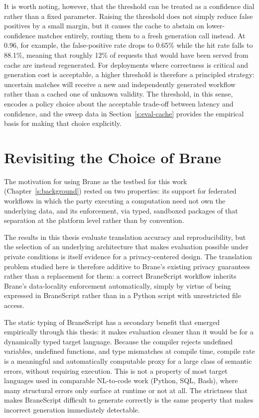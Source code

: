It is worth noting, however, that the threshold can be treated as a
confidence dial rather than a fixed parameter. Raising the threshold does not
simply reduce false positives by a small margin, but it causes the cache to
abstain on lower-confidence matches entirely, routing them to a fresh
generation call instead. At 0.96, for example, the false-positive rate drops
to 0.65\% while the hit rate falls to 88.1\%, meaning that roughly 12\% of
requests that would have been served from cache are instead regenerated. For
deployments where correctness is critical and generation cost is acceptable,
a higher threshold is therefore a principled strategy: uncertain matches will
receive a new and independently generated workflow rather than a cached one of
unknown validity. The threshold, in this sense, encodes a policy choice about
the acceptable trade-off between latency and confidence, and the sweep data
in Section~\ref{s:eval-cache} provides the empirical basis for making that
choice explicitly.


\section{Revisiting the Choice of Brane}

The motivation for using Brane as the testbed for this work
(Chapter~\ref{s:background}) rested on two properties: its support for
federated workflows in which the party executing a computation need not own
the underlying data, and its enforcement, via typed, sandboxed packages
of that separation at the platform level rather than by convention. 

The results in this thesis evaluate translation accuracy and reproducibility, 
but the selection of an underlying architecture that makes evaluation possible under private conditions
is itself evidence for a privacy-centered design. 
The translation problem studied here is therefore additive to Brane's existing privacy guarantees
rather than a replacement for them: a correct BraneScript workflow inherits
Brane's data-locality enforcement automatically, simply by virtue of being
expressed in BraneScript rather than in a Python script with unrestricted file
access.

The static typing of BraneScript has a secondary benefit that emerged
empirically through this thesis: it makes evaluation cleaner than it would be
for a dynamically typed target language. Because the compiler rejects undefined
variables, undefined functions, and type mismatches at compile time, compile
rate is a meaningful and automatically computable proxy for a large class of
semantic errors, without requiring execution. This is not a property of most
target languages used in comparable NL-to-code work (Python, SQL, Bash), where
many structural errors only surface at runtime or not at all. The strictness
that makes BraneScript difficult to generate correctly is the same property
that makes incorrect generation immediately detectable.

